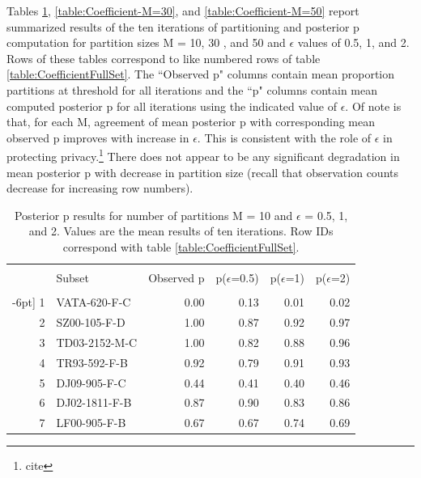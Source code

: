 \documentclass[10pt, letterpaper]{article}
\begin{document}
\begin{spacing}{1.0}
\vspace{20pt}

Tables \ref{table:Coefficient-M=10}, \ref{table:Coefficient-M=30}, and \ref{table:Coefficient-M=50} report summarized results of the ten iterations of partitioning and posterior p computation for partition sizes M = 10, 30 , and 50 and $\epsilon$ values of 0.5, 1, and 2.  Rows of these tables correspond to like numbered rows of table \ref{table:CoefficientFullSet}.  The ``Observed p" columns contain mean proportion partitions at threshold for all iterations and the ``p" columns contain mean computed posterior p for all iterations using the indicated value of $\epsilon$.  Of note is that, for each M, agreement of mean posterior p with corresponding mean observed p improves with increase in $\epsilon$.  This is consistent with the role of $\epsilon$ in protecting privacy.\footnote{cite}  There does not appear to be any significant degradation in mean posterior p with decrease in partition size (recall that observation counts decrease for increasing row numbers).

\begin{table}[h]
    \centering
    \caption{Posterior p results for number of partitions M = 10 and $\epsilon$ = 0.5, 1, and 2.  Values are the mean results of ten iterations.  Row IDs correspond with table \ref{table:CoefficientFullSet}.}
    \begin{tabular}{rlrrrr}
        \hline\\[-10pt]
        & Subset & Observed p & p($\epsilon$=0.5) & p($\epsilon$=1) & p($\epsilon$=2) \\ 
        \hline\\-6pt]
        1 & VATA-620-F-C & 0.00 & 0.13 & 0.01 & 0.02 \\ 
        2 & SZ00-105-F-D & 1.00 & 0.87 & 0.92 & 0.97 \\ 
        3 & TD03-2152-M-C & 1.00 & 0.82 & 0.88 & 0.96 \\ 
        4 & TR93-592-F-B & 0.92 & 0.79 & 0.91 & 0.93 \\ 
        5 & DJ09-905-F-C & 0.44 & 0.41 & 0.40 & 0.46 \\ 
        6 & DJ02-1811-F-B & 0.87 & 0.90 & 0.83 & 0.86 \\ 
        7 & LF00-905-F-B & 0.67 & 0.67 & 0.74 & 0.69 \\ 
        \hline
    \end{tabular}
    \label{table:Coefficient-M=10}
\end{table}


\end{spacing}
\end{document}
